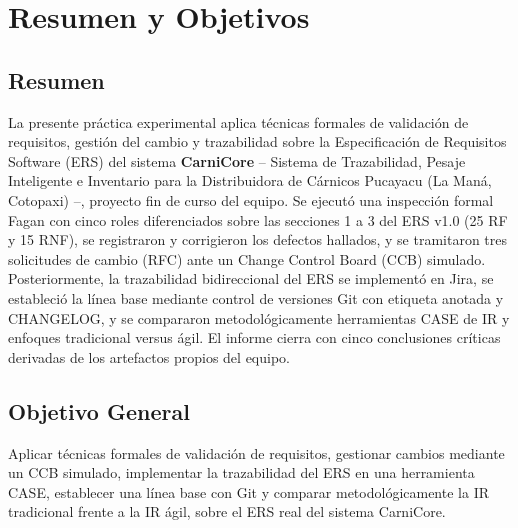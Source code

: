 \documentclass[11pt,a4paper]{article}
\begin{document}
\newpage
\tableofcontents
\newpage

\section{Resumen y Objetivos}
\subsection{Resumen}
La presente práctica experimental aplica técnicas formales de validación de requisitos,
gestión del cambio y trazabilidad sobre la Especificación de Requisitos Software (ERS)
del sistema \textbf{CarniCore} -- Sistema de Trazabilidad, Pesaje Inteligente e Inventario para la
Distribuidora de Cárnicos Pucayacu (La Maná, Cotopaxi) --, proyecto fin de curso del equipo.
Se ejecutó una inspección formal Fagan con cinco roles diferenciados sobre las secciones 1 a 3
del ERS v1.0 (25 RF y 15 RNF), se registraron y corrigieron los defectos hallados, y se tramitaron
tres solicitudes de cambio (RFC) ante un Change Control Board (CCB) simulado. Posteriormente,
la trazabilidad bidireccional del ERS se implementó en Jira, se estableció la línea base mediante
control de versiones Git con etiqueta anotada y CHANGELOG, y se compararon metodológicamente
herramientas CASE de IR y enfoques tradicional versus ágil. El informe cierra con cinco
conclusiones críticas derivadas de los artefactos propios del equipo.

\subsection{Objetivo General}
Aplicar técnicas formales de validación de requisitos, gestionar cambios mediante un
CCB simulado, implementar la trazabilidad del ERS en una herramienta CASE, establecer
una línea base con Git y comparar metodológicamente la IR tradicional frente a la IR
ágil, sobre el ERS real del sistema CarniCore.
\end{document}
